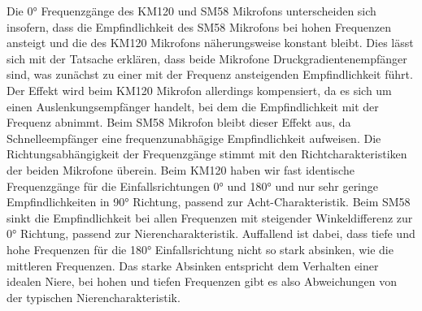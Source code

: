 Die 0° Frequenzgänge des KM120 und SM58 Mikrofons unterscheiden sich insofern, dass die Empfindlichkeit des SM58 Mikrofons bei hohen Frequenzen ansteigt und die des KM120 Mikrofons näherungsweise konstant bleibt.
Dies lässt sich mit der Tatsache erklären, dass beide Mikrofone Druckgradientenempfänger sind, was zunächst zu einer mit der Frequenz ansteigenden Empfindlichkeit führt.
Der Effekt wird beim KM120 Mikrofon allerdings kompensiert, da es sich um einen Auslenkungsempfänger handelt, bei dem die Empfindlichkeit mit der Frequenz abnimmt.
Beim SM58 Mikrofon bleibt dieser Effekt aus, da Schnelleempfänger eine frequenzunabhägige Empfindlichkeit aufweisen.
Die Richtungsabhängigkeit der Frequenzgänge stimmt mit den Richtcharakteristiken der beiden Mikrofone überein.
Beim KM120 haben wir fast identische Frequenzgänge für die Einfallsrichtungen 0° und 180° und nur sehr geringe Empfindlichkeiten in 90° Richtung, passend zur Acht-Charakteristik.
Beim SM58 sinkt die Empfindlichkeit bei allen Frequenzen mit steigender Winkeldifferenz zur 0° Richtung, passend zur Nierencharakteristik.
Auffallend ist dabei, dass tiefe und hohe Frequenzen für die 180° Einfallsrichtung nicht so stark absinken, wie die mittleren Frequenzen.
Das starke Absinken entspricht dem Verhalten einer idealen Niere, bei hohen und tiefen Frequenzen gibt es also Abweichungen von der typischen Nierencharakteristik.  

